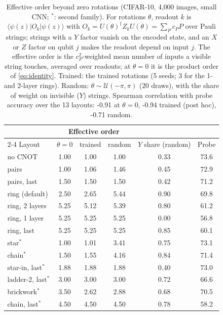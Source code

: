 \begin{table}[h]
\centering
\caption{Effective order beyond zero rotations (CIFAR-10, 4,000 images, small CNN; $^\ast$: second
family). For rotations $\theta$, readout $k$ is $\langle\psi(z)|O_k|\psi(z)\rangle$ with
$O_k=U(\theta)^\dagger Z_kU(\theta)=\sum_P c_PP$ over Pauli strings; strings with a $Y$ factor
vanish on the encoded state, and an $X$ or $Z$ factor on qubit $j$ makes the readout depend on
input $j$. The effective order is the $c_P^2$-weighted mean number of inputs a visible string
touches, averaged over readouts; at $\theta=0$ it is the product order of \cref{eq:identity}.
Trained: the trained rotations (5 seeds; 3 for the 1- and 2-layer rings). Random: $\theta\sim
\mathcal{U}(-\pi,\pi)$ (20 draws), with the share of weight on invisible ($Y$) strings. Spearman
correlation with probe accuracy over the 13 layouts: -0.91 at $\theta=0$, -0.94 trained (post hoc), -0.71 random.}
\label{tab:efforder}
\small
\begin{tabular}{lccccc}
\toprule
& \multicolumn{3}{c}{Effective order} & & \\
\cmidrule(lr){2-4}
Layout & $\theta=0$ & trained & random & $Y$ share (random) & Probe \\
\midrule
no CNOT & 1.00 & 1.00 & 1.00 & 0.33 & 73.6 \\
pairs & 1.00 & 1.06 & 1.46 & 0.45 & 72.9 \\
pairs, last & 1.50 & 1.50 & 1.50 & 0.42 & 71.2 \\
ring (default) & 2.50 & 2.65 & 5.44 & 0.90 & 69.8 \\
ring, 2 layers & 5.25 & 5.12 & 5.39 & 0.80 & 61.2 \\
ring, 1 layer & 5.25 & 5.25 & 5.25 & 0.00 & 56.8 \\
ring, last & 5.25 & 5.25 & 5.25 & 0.85 & 60.1 \\
star$^\ast$ & 1.00 & 1.01 & 3.41 & 0.75 & 73.1 \\
chain$^\ast$ & 1.50 & 1.55 & 4.16 & 0.84 & 71.4 \\
star-in, last$^\ast$ & 1.88 & 1.88 & 1.88 & 0.40 & 73.0 \\
ladder-2, last$^\ast$ & 3.00 & 3.00 & 3.00 & 0.72 & 66.6 \\
brickwork$^\ast$ & 3.50 & 2.62 & 2.88 & 0.68 & 70.5 \\
chain, last$^\ast$ & 4.50 & 4.50 & 4.50 & 0.78 & 58.2 \\
\bottomrule
\end{tabular}
\end{table}
